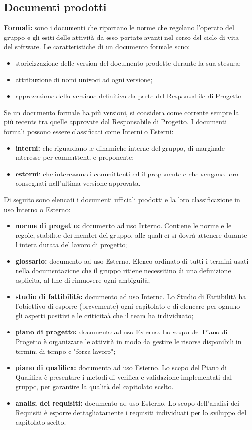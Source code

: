 \subsection{Documenti prodotti}
	 \textbf{Formali:} sono i documenti che riportano le norme che regolano l’operato del gruppo e gli esiti delle attività da esso portate avanti nel corso del ciclo di vita del software. Le caratteristiche di un documento formale sono:
\begin{itemize}
\item storicizzazione delle version del documento prodotte durante la sua stesura;
	\item attribuzione di nomi univoci ad ogni versione;
		\item approvazione della versione definitiva da parte del Responsabile di Progetto.	
\end{itemize}
Se un documento formale ha più versioni, si considera come corrente sempre la più recente tra quelle approvate dal Responsabile di Progetto. I documenti formali possono essere classificati come Interni o Esterni: 
\begin{itemize}
\item \textbf {interni:} che riguardano le dinamiche interne del gruppo, di marginale interesse per committenti e proponente;
	\item \textbf {esterni:}  che interessano i committenti ed il proponente e che vengono loro consegnati nell’ultima versione approvata.
\end{itemize}
Di seguito sono elencati i documenti ufficiali prodotti e la loro classificazione in uso Interno o Esterno: 
\begin{itemize}
\item \textbf{norme di progetto:} documento ad uso Interno. Contiene le norme e le regole, stabilite dei membri del gruppo, alle quali ci si dovrà attenere durante l intera durata del lavoro di progetto;
	\item \textbf{glossario:} documento ad uso Esterno. Elenco ordinato di tutti i termini usati nella documentazione che il gruppo ritiene necessitino di una definizione esplicita, al fine di rimuovere ogni ambiguità; 
		\item \textbf{studio di fattibilità:} documento ad uso Interno. Lo Studio di Fattibilità ha l’obiettivo di esporre (brevemente) ogni capitolato e di elencare per ognuno gli aspetti positivi e le criticitaà che il team ha individuato; 
			\item \textbf{piano di progetto:} documento ad uso Esterno. Lo scopo del Piano di Progetto è organizzare le attività in modo da gestire le risorse disponibili in termini di tempo e "forza lavoro"; 
				\item \textbf{piano di qualifica:} documento ad uso Esterno. Lo scopo del Piano di Qualifica è presentare i metodi di verifica e validazione implementati dal gruppo, per garantire la qualità del capitolato scelto.
					\item \textbf{analisi dei requisiti:} documento ad uso Esterno. Lo scopo dell'analisi dei Requisiti è esporre dettagliatamente i requisiti individuati per lo sviluppo del capitolato scelto.
\end{itemize}

